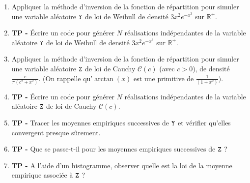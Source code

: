\documentclass[solutions]{exercices}
\begin{document}
\begin{exercice}
\begin{enumerate}
\item Appliquer la méthode d'inversion de la fonction de répartition pour simuler une variable al\'eatoire $\tt Y$ de loi de Weibull de densité $3x^{2} e^{-x^3}$ sur $\mathbb{R}^+$.
\item \textbf{TP -} Écrire un code pour g\'en\'erer
$N$ r\'ealisations  ind\'ependantes de la variable al\'eatoire
$\tt Y$ de loi de Weibull de densité $3x^{2} e^{-x^3}$ sur $\mathbb{R}^+$.
\item Appliquer la méthode d'inversion de la fonction de répartition pour simuler une variable al\'eatoire $\tt Z$ de loi de Cauchy ${\mathcal C}(c)$ (avec $c>0$), de densité $\frac{c}{\pi(c^2+x^2)}$. (On rappelle qu'$\arctan(x)$ est une primitive de $\frac{1}{(1+x^2)}).$
\item \textbf{TP -} Écrire un code pour g\'en\'erer $N$ r\'ealisations  ind\'ependantes de la variable al\'eatoire $\tt Z$ de loi de Cauchy ${\mathcal C}(c)$.
\item \textbf{TP -} Tracer les moyennes empiriques successives de $\tt Y$ et v\'erifier qu'elles convergent presque sûrement.
\item \textbf{TP -} Que se passe-t-il pour les moyennes empiriques successives de $\tt Z$ ?
\item \textbf{TP -} A l'aide d'un histogramme, observer quelle est la loi de la moyenne empirique associ\'ee \`a $\tt Z$ ?
\end{enumerate}
\end{exercice}
\end{document}
